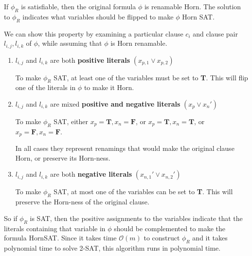 \begin{enumerate}[label=(\alph*)]
    If $\phi_R$ is satisfiable, then the original formula $\phi$ is renamable Horn. The solution to $\phi_R$ indicates what variables should be flipped to make $\phi$ Horn SAT.

    We can show this property by examining a particular clause $c_i$ and clause pair $l_{i,j}, l_{i,k}$ of $\phi$, while assuming that $\phi$ is Horn renamable.
    \begin{enumerate}
      \item $l_{i,j}$ and $l_{i,k}$ are both \textbf{positive literals} $(x_{p,1} \lor x_{p,2})$

        To make $\phi_R$ SAT, at least one of the variables must be set to \textbf{T}. This will flip one of the literals in $\phi$ to make it Horn.

      \item $l_{i,j}$ and $l_{i,k}$ are mixed \textbf{positive and negative literals} $(x_p \lor x_n')$

        To make $\phi_R$ SAT, either $x_p = \mathbf{T}, x_n = \mathbf{F}$, or $x_p = \mathbf{T}, x_n = \mathbf{T}$, or $x_p = \mathbf{F}, x_n = \mathbf{F}$.

        In all cases they represent renamings that would make the original clause Horn, or preserve its Horn-ness.

      \item $l_{i,j}$ and $l_{i,k}$ are both \textbf{negative literals} $(x_{n,1}' \lor x_{n,2}')$

        To make $\phi_R$ SAT, at most one of the variables can be set to \textbf{T}. This will preserve the Horn-ness of the original clause.
    \end{enumerate}

    So if $\phi_R$ is SAT, then the positive assignments to the variables indicate that the literals containing that variable in $\phi$ should be complemented to make the formula HornSAT. Since it takes time $\mathcal{O}(m)$ to construct $\phi_R$ and it takes polynomial time to solve 2-SAT, this algorithm runs in polynomial time.
\end{enumerate}

